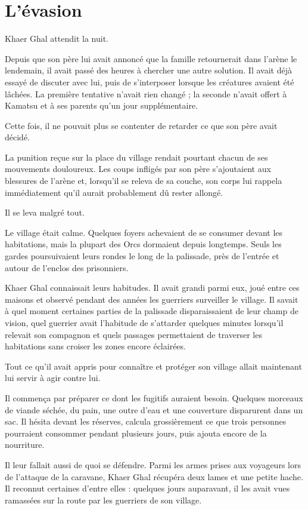 \chapter{L'évasion}
\label{chap:evasion}

Khaer Ghal attendit la nuit.

Depuis que son père lui avait annoncé que la famille retournerait dans l'arène
le lendemain, il avait passé des heures à chercher une autre solution. Il
avait déjà essayé de discuter avec lui, puis de s'interposer lorsque les
créatures avaient été lâchées. La première tentative n'avait rien changé ; la
seconde n'avait offert à Kamatsu et à ses parents qu'un jour supplémentaire.

Cette fois, il ne pouvait plus se contenter de retarder ce que son père avait
décidé.

La punition reçue sur la place du village rendait pourtant chacun de ses
mouvements douloureux. Les coups infligés par son père s'ajoutaient aux
blessures de l'arène et, lorsqu'il se releva de sa couche, son corps lui
rappela immédiatement qu'il aurait probablement dû rester allongé.

Il se leva malgré tout.

Le village était calme. Quelques foyers achevaient de se consumer devant les
habitations, mais la plupart des Orcs dormaient depuis longtemps. Seuls les
gardes poursuivaient leurs rondes le long de la palissade, près de l'entrée et
autour de l'enclos des prisonniers.

Khaer Ghal connaissait leurs habitudes. Il avait grandi parmi eux, joué entre
ces maisons et observé pendant des années les guerriers surveiller le village.
Il savait à quel moment certaines parties de la palissade disparaissaient de
leur champ de vision, quel guerrier avait l'habitude de s'attarder quelques
minutes lorsqu'il relevait son compagnon et quels passages permettaient de
traverser les habitations sans croiser les zones encore éclairées.

Tout ce qu'il avait appris pour connaître et protéger son village allait
maintenant lui servir à agir contre lui.

Il commença par préparer ce dont les fugitifs auraient besoin. Quelques
morceaux de viande séchée, du pain, une outre d'eau et une couverture
disparurent dans un sac. Il hésita devant les réserves, calcula grossièrement
ce que trois personnes pourraient consommer pendant plusieurs jours, puis
ajouta encore de la nourriture.

Il leur fallait aussi de quoi se défendre. Parmi les armes prises aux voyageurs
lors de l'attaque de la caravane, Khaer Ghal récupéra deux lames et une petite
hache. Il reconnut certaines d'entre elles : quelques jours auparavant, il les
avait vues ramassées sur la route par les guerriers de son village.

